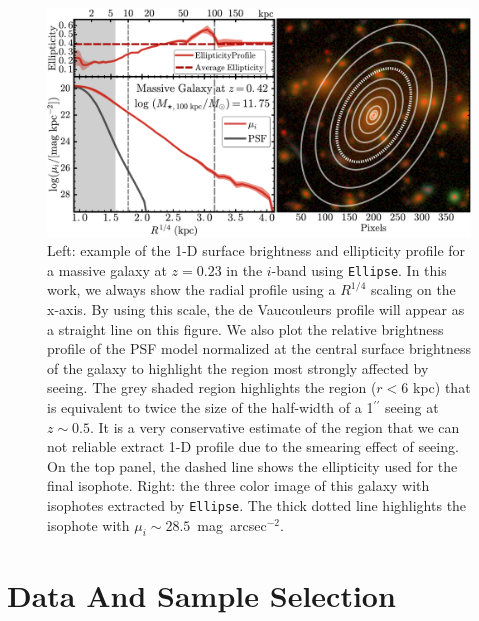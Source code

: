 \documentclass[a4paper,fleqn,usenatbib]{mnras}
\def\asec{$^{\prime\prime}$}
\def\sb{mag~arcsec$^{-2}$}
\begin{document}
    \begin{figure}
        \centering 
        \includegraphics[width=\textwidth]{fig/redbcg_ellipse_example}
        \caption{
            Left: example of the 1-D surface brightness and ellipticity profile 
            for a massive galaxy at $z=0.23$ in the $i$-band using \texttt{Ellipse}. 
            In this work, we always show the radial profile using a $R^{1/4}$ scaling 
            on the x-axis.
            By using this scale, the de Vaucouleurs profile will appear as a straight 
            line on this figure.  
            We also plot the relative brightness profile of the PSF model normalized 
            at the central surface brightness of the galaxy to highlight the region 
            most strongly affected by seeing.
            The grey shaded region highlights the region ($r<6$ kpc) that is equivalent 
            to twice the size of the half-width of a 1\asec{} seeing at $z\sim 0.5$.
            It is a very conservative estimate of the region that we can not reliable 
            extract 1-D profile due to the smearing effect of seeing.
            On the top panel, the dashed line shows the ellipticity used for the final 
            isophote. 
            Right: the three color image of this galaxy with isophotes 
            extracted by \texttt{Ellipse}. 
            The thick dotted line highlights the isophote with 
            $\mu_{i}{\sim} 28.5$~\sb.
            }
        \label{fig:ellipse}
    \end{figure}

\section{Data And Sample Selection}
    \label{sec:data}
\end{document}
